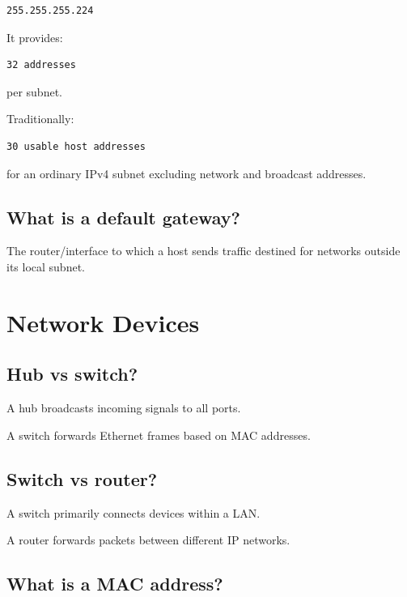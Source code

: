\begin{lstlisting}
255.255.255.224
\end{lstlisting}

It provides:

\begin{lstlisting}
32 addresses
\end{lstlisting}

per subnet.

Traditionally:

\begin{lstlisting}
30 usable host addresses
\end{lstlisting}

for an ordinary IPv4 subnet excluding network and broadcast addresses.

\medskip

\subsection{What is a default gateway?}

The router/interface to which a host sends traffic destined for networks outside its local subnet.

\medskip

\section{Network Devices}

\subsection{Hub vs switch?}

A hub broadcasts incoming signals to all ports.

A switch forwards Ethernet frames based on MAC addresses.

\medskip

\subsection{Switch vs router?}

A switch primarily connects devices within a LAN.

A router forwards packets between different IP networks.

\medskip

\subsection{What is a MAC address?}

